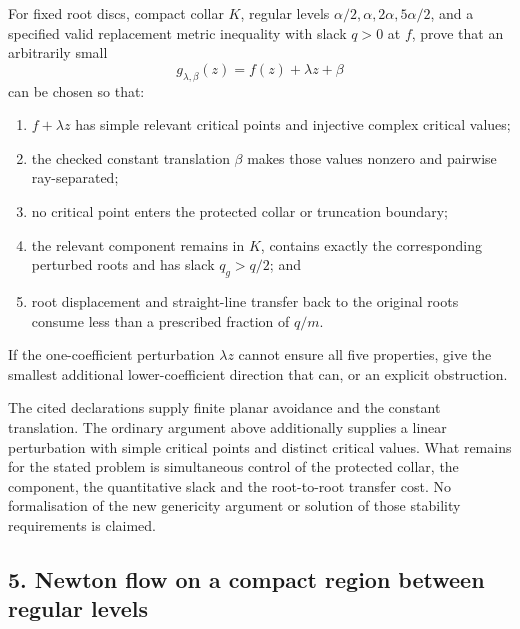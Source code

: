 \documentclass[11pt]{article}
\begin{document}
\begin{problem}\label{prob:perturb1041}
For fixed root discs, compact collar $K$, regular levels
$\alpha/2,\alpha,2\alpha,5\alpha/2$, and a specified valid replacement metric
inequality with slack $q>0$ at $f$, prove that an arbitrarily small
\[
 g_{\lambda,\beta}(z)=f(z)+\lambda z+\beta
\]
can be chosen so that:

\begin{enumerate}
\item $f+\lambda z$ has simple relevant critical points and injective complex
critical values;
\item the checked constant translation $\beta$ makes those values nonzero and
pairwise ray-separated;
\item no critical point enters the protected collar or truncation boundary;
\item the relevant component remains in $K$, contains exactly the corresponding
perturbed roots and has slack $q_g>q/2$; and
\item root displacement and straight-line transfer back to the original roots
consume less than a prescribed fraction of $q/m$.
\end{enumerate}

If the one-coefficient perturbation $\lambda z$ cannot ensure all five
properties, give the smallest additional lower-coefficient direction that can,
or an explicit obstruction.
\end{problem}

The cited declarations supply finite planar avoidance and the constant
translation. The ordinary argument above additionally supplies a linear
perturbation with simple critical points and distinct critical values.
What remains for the stated problem is simultaneous control of the
protected collar, the component, the quantitative slack and the
root-to-root transfer cost. No formalisation of the new genericity
argument or solution of those stability requirements is claimed.

\subsection*{5. Newton flow on a compact region between regular levels}
\end{document}
